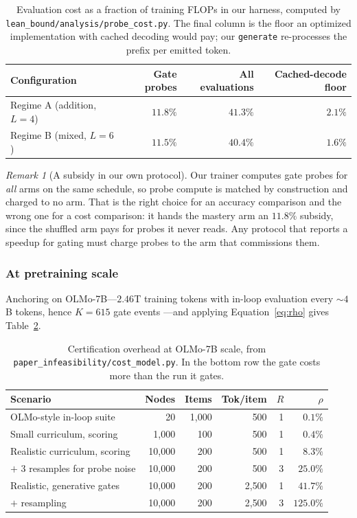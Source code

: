 \documentclass[11pt]{article}
\theoremstyle{plain}
\theoremstyle{definition}
\theoremstyle{remark}
\newtheorem*{remark}{Remark}
\begin{document}
\begin{table}[ht]
\centering
\small
\begin{tabular}{@{}lrrr@{}}
\toprule
Configuration & Gate probes & All evaluations & Cached-decode floor \\
\midrule
Regime A (addition, $L{=}4$) & $11.8\%$ & $41.3\%$ & $2.1\%$ \\
Regime B (mixed, $L{=}6$) & $11.5\%$ & $40.4\%$ & $1.6\%$ \\
\bottomrule
\end{tabular}
\caption{Evaluation cost as a fraction of training FLOPs in our harness,
computed by \texttt{lean\_bound/analysis/probe\_cost.py}. The final column is the
floor an optimized implementation with cached decoding would pay; our
\texttt{generate} re-processes the prefix per emitted token.}
\label{tab:ourcost}
\end{table}

\begin{remark}[A subsidy in our own protocol]
Our trainer computes gate probes for \emph{all} arms on the same schedule, so
probe compute is matched by construction and charged to no arm. That is the right
choice for an accuracy comparison and the wrong one for a cost comparison: it
hands the mastery arm an $11.8\%$ subsidy, since the shuffled arm pays for probes
it never reads. Any protocol that reports a speedup for gating must charge probes
to the arm that commissions them.
\end{remark}

\subsubsection{At pretraining scale}

Anchoring on OLMo-7B---$2.46$T training tokens with in-loop evaluation every
${\sim}4$B tokens, hence $K = 615$ gate events \citep{groeneveld2024olmo}---and
applying Equation~\ref{eq:rho} gives Table~\ref{tab:scalecost}.

\begin{table}[ht]
\centering
\small
\begin{tabular}{@{}lrrrrr@{}}
\toprule
Scenario & Nodes & Items & Tok/item & $R$ & $\rho$ \\
\midrule
OLMo-style in-loop suite & 20 & 1{,}000 & 500 & 1 & $0.1\%$ \\
Small curriculum, scoring & 1{,}000 & 100 & 500 & 1 & $0.4\%$ \\
Realistic curriculum, scoring & 10{,}000 & 200 & 500 & 1 & $8.3\%$ \\
\quad $+$ 3 resamples for probe noise & 10{,}000 & 200 & 500 & 3 & $25.0\%$ \\
Realistic, generative gates & 10{,}000 & 200 & 2{,}500 & 1 & $41.7\%$ \\
\quad $+$ resampling & 10{,}000 & 200 & 2{,}500 & 3 & $\mathbf{125.0\%}$ \\
\bottomrule
\end{tabular}
\caption{Certification overhead at OLMo-7B scale, from
\texttt{paper\_infeasibility/cost\_model.py}. In the bottom row the gate costs
more than the run it gates.}
\label{tab:scalecost}
\end{table}
\end{document}
